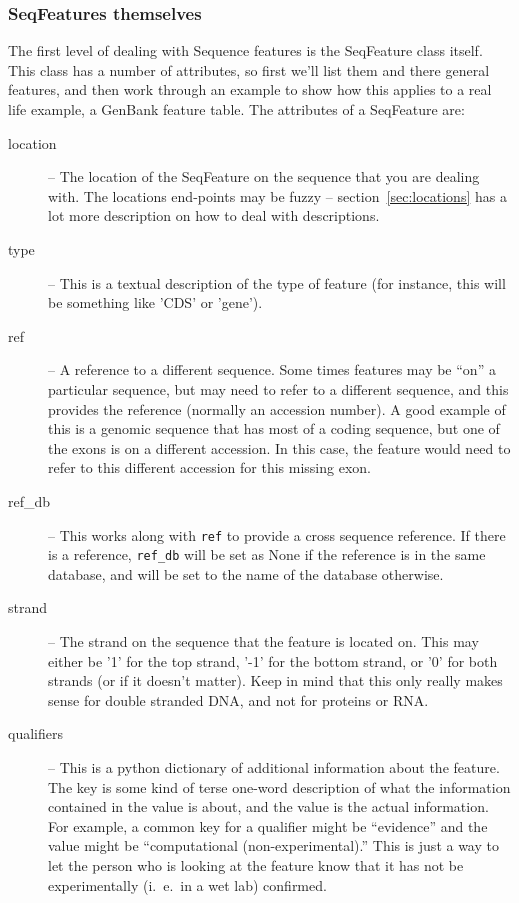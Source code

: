 \documentclass{report}
\begin{document}
\subsubsection{SeqFeatures themselves}

The first level of dealing with Sequence features is the SeqFeature class itself. This class has a number of attributes, so first we'll list them and there general features, and then work through an example to show how this applies to a real life example, a GenBank feature table. The attributes of a SeqFeature are:

\begin{description}
  \item[location] -- The location of the SeqFeature on the sequence that you are dealing with. The locations end-points may be fuzzy -- section~\ref{sec:locations} has a lot more description on how to deal with descriptions.

  \item[type] -- This is a textual description of the type of feature (for instance, this will be something like 'CDS' or 'gene').

  \item[ref] -- A reference to a different sequence. Some times features may be ``on'' a particular sequence, but may need to refer to a different sequence, and this provides the reference (normally an accession number). A good example of this is a genomic sequence that has most of a coding sequence, but one of the exons is on a different accession. In this case, the feature would need to refer to this different accession for this missing exon.

  \item[ref\_db] -- This works along with \verb|ref| to provide a cross sequence reference. If there is a reference, \verb|ref_db| will be set as None if the reference is in the same database, and will be set to the name of the database otherwise.

  \item[strand] -- The strand on the sequence that the feature is located on. This may either be '1' for the top strand, '-1' for the bottom strand, or '0' for both strands (or if it doesn't matter). Keep in mind that this only really makes sense for double stranded DNA, and not for proteins or RNA. 

  \item[qualifiers] -- This is a python dictionary of additional information about the feature. The key is some kind of terse one-word description of what the information contained in the value is about, and the value is the actual information. For example, a common key for a qualifier might be ``evidence'' and the value might be ``computational (non-experimental).'' This is just a way to let the person who is looking at the feature know that it has not be experimentally (i.~e.~in a wet lab) confirmed.
  

\end{description}
\end{document}
